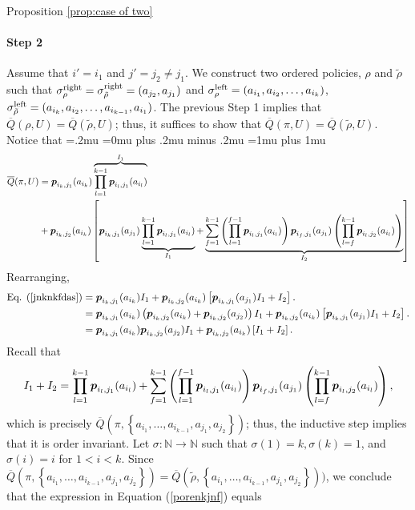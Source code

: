 \begin{proofof}{Proposition \ref{prop:case of two}}
\paragraph{Step 2} Assume that $i'=i_1$ and $j' = j_2 \neq j_1$. We construct two ordered policies, $\rho$ and $\tilde \rho$ such that $\sigma^{\textnormal{right}}_\rho=\sigma^{\textnormal{right}}_{\tilde \rho}=(a_{j_2},a_{j_1})$ and $\sigma^{\textnormal{left}}_\rho=(a_{i_1},a_{i_2},\dots, a_{i_k})$, $\sigma^{\textnormal{left}}_{\tilde \rho}=(a_{i_k},a_{i_2},\dots, a_{i_{k-1}},a_{i_1})$. The previous Step 1 implies that $\overline Q(\rho,U)=\overline Q(\tilde \rho, U)$; thus, it suffices to show that $\overline Q(\pi,U)=\overline Q(\tilde \rho, U)$. Notice that
{\thinmuskip=.2mu
\medmuskip=0mu plus .2mu minus .2mu
\thickmuskip=1mu plus 1mu
\begin{align}\label{jnknkfdas}
\overline Q(\pi,U)&=\boldsymbol{ p }_{i_k,j_1}(a_{i_k})\overbrace{\prod_{l=1}^{k-1} \boldsymbol{ p }_{{i_l},{j_1}}(a_{i_l})}^{I_1}\nonumber \\
&+\boldsymbol{ p }_{i_k,j_2}(a_{i_k})\left[\boldsymbol{ p }_{i_k,j_1}(a_{j_1})\underbrace{\prod_{l=1}^{k-1} \boldsymbol{ p }_{{i_l},{j_1}}(a_{i_l})}_{I_1}+\underbrace{\sum_{f=1}^{k-1} \left(\prod_{l=1}^{f-1} \boldsymbol{ p }_{{i_l},{j_1}}(a_{i_l})\right) \boldsymbol{ p }_{{i_f},{j_1}}(a_{j_1}) \left(\prod_{l=f}^{k-1} \boldsymbol{ p }_{{i_l},{j_2}}(a_{i_l})\right)}_{I_2}  \right]
\end{align}}%
Rearranging,
\begin{align}\label{eq:kijnjvfvs}
\textnormal{Eq. }\refeq{jnknkfdas} &=\bl p_{i_k,j_1}(a_{i_k})I_1+\bl p_{i_k,j_2}(a_{i_k})\left[\bl p_{i_k,j_1}(a_{j_1})I_1+I_2  \right]. \nonumber \\
&= \bl p_{i_k,j_1}(a_{i_k})\left( \bl p_{i_k,j_2}(a_{i_k})+\bl p_{i_k,j_2}(a_{j_2}) \right) I_1+\bl p_{i_k,j_2}(a_{i_k})\left[\bl p_{i_k,j_1}(a_{j_1})I_1+I_2  \right]. \nonumber \\
&= \bl p_{i_k,j_1}(a_{i_k})\bl p_{i_k,j_2}(a_{j_2})I_1+\bl p_{i_k,j_2}(a_{i_k})\left[I_1+I_2  \right]. 
\end{align}
Recall that
\begin{align} \label{porenkjnf}
I_1+I_2=\prod_{l=1}^{k-1} \boldsymbol{ p }_{{i_l},{j_1}}(a_{i_l})+\sum_{f=1}^{k-1} \left(\prod_{l=1}^{f-1} \boldsymbol{ p }_{{i_l},{j_1}}(a_{i_l})\right) \boldsymbol{ p }_{{i_f},{j_1}}(a_{j_1}) \left(\prod_{l=f}^{k-1} \boldsymbol{ p }_{{i_l},{j_2}}(a_{i_l})\right),
\end{align}
which is precisely $\overline Q(\pi,\left\{a_{i_1},\dots, a_{i_{k-1}},a_{j_1},a_{j_2}\right\})$; thus, the inductive step implies that it is order invariant. Let $\sigma:\mathbb N \rightarrow \mathbb N$ such that $\sigma(1)=k,\sigma(k)=1$, and $\sigma(i)=i$ for $1<i<k$. Since $\overline Q(\pi,\left\{a_{i_1},\dots, a_{i_{k-1}},a_{j_1},a_{j_2}\right\})=\overline Q(\tilde \rho,\left\{a_{i_1},\dots, a_{i_{k-1}},a_{j_1},a_{j_2}\right\}))$, we conclude that the expression in Equation (\ref{porenkjnf}) equals 

\end{proofof}

